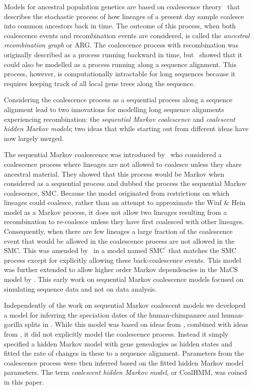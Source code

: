 \documentclass[graybox]{svmult}
\begin{document}
Models for ancestral population genetics are based on coalescence theory~\cite{Hein:2005vz} that describes the stochastic process of how lineages of a present day sample coalesce into common ancestors back in time. The outcome of this process, when both coalescence events and recombination events are considered, is called the \emph{ancestral recombination graph} or ARG. The coalescence process with recombination was originally described as a process running backward in time, but~\citet{Wiuf:1999gu} showed that it could also be modelled as a process running along a sequence alignment. This process, however, is computationally intractable for long sequences because it requires keeping track of all local gene trees along the sequence.

Considering the coalescence process as a sequential process along a sequence alignment lead to two innovations for modelling long sequence alignments experiencing recombination: the \emph{sequential Markov coalescence} and \emph{coalescent hidden Markov models}; two ideas that while starting out from different ideas have now largely merged.

The sequential Markov coalescence was introduced by~\citet{McVean:2005ho} who considered a coalescence process where lineages are not allowed to coalesce unless they share ancestral material. They showed that this process would be Markov when considered as a sequential process and dubbed the process the sequential Markov coalescence, SMC. Because the model originated from restrictions on which lineages could coalesce, rather than an attempt to approximate the Wiuf \& Hein model as a Markov process, it does not allow two lineages resulting from a recombination to re-coalesce unless they have first coalesced with other lineages. Consequently, when there are few lineages a large fraction of the coalescence event that would be allowed in the coalescence process are not allowed in the SMC. This was amended by~\citet{Marjoram:2006hp} in a model named SMC$^\prime$ that matches the SMC process except for explicitly allowing these back-coalescence events. This model was further extended to allow higher order Markov dependencies in the MaCS model by \citet{Chen:2009fg}. This early work on sequential Markov coalescence models focused on simulating sequence data and not on data analysis.

Independently of the work on sequential Markov coalescent models we developed a model for inferring the speciation dates of the human-chimpanzee and human-gorilla splits in \citet{Hobolth:2007gz}. While this model was based on ideas from \citet{Wiuf:1999gu}, combined with ideas from \citet{Takahata1995Divergence-time}, it did not explicitly model the coalescence process. Instead it simply specified a hidden Markov model with gene genealogies as hidden states and fitted the rate of changes in these to a sequence alignment. Parameters from the coalescence process were then inferred based on the fitted hidden Markov model parameters. The term \emph{coalescent hidden Markov model}, or CoalHMM, was coined in this paper.
\end{document}
